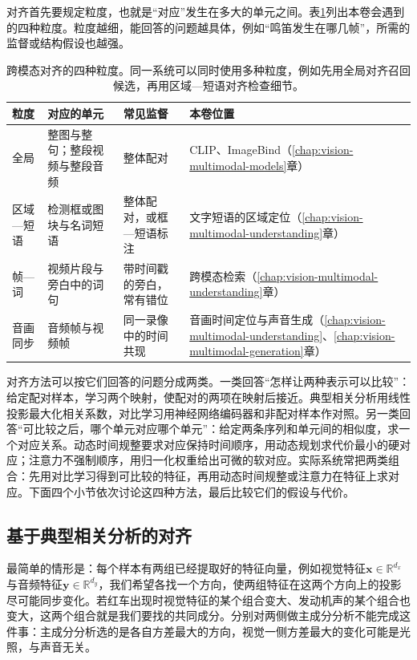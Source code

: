对齐首先要规定粒度，也就是“对应”发生在多大的单元之间。表\ref{tab:vision-alignment-granularity}列出本卷会遇到的四种粒度。粒度越细，能回答的问题越具体，例如“鸣笛发生在哪几帧”，所需的监督或结构假设也越强。

\begin{table}[htbp]
  \centering
  \small
  \begin{tabularx}{\linewidth}{@{}p{16mm}p{30mm}XX@{}}
    \toprule
    粒度 & 对应的单元 & 常见监督 & 本卷位置\\
    \midrule
    全局 & 整图与整句；整段视频与整段音频 & 整体配对 & CLIP、ImageBind（\ref{chap:vision-multimodal-models}章）\\
    区域—短语 & 检测框或图块与名词短语 & 整体配对，或框—短语标注 & 文字短语的区域定位（\ref{chap:vision-multimodal-understanding}章）\\
    帧—词 & 视频片段与旁白中的词句 & 带时间戳的旁白，常有错位 & 跨模态检索（\ref{chap:vision-multimodal-understanding}章）\\
    音画同步 & 音频帧与视频帧 & 同一录像中的时间共现 & 音画时间定位与声音生成（\ref{chap:vision-multimodal-understanding}、\ref{chap:vision-multimodal-generation}章）\\
    \bottomrule
  \end{tabularx}
  \caption{跨模态对齐的四种粒度。同一系统可以同时使用多种粒度，例如先用全局对齐召回候选，再用区域—短语对齐检查细节。}
  \label{tab:vision-alignment-granularity}
\end{table}

对齐方法可以按它们回答的问题分成两类。一类回答“怎样让两种表示可以比较”：给定配对样本，学习两个映射，使配对的两项在映射后接近。典型相关分析用线性投影最大化相关系数，对比学习用神经网络编码器和非配对样本作对照。另一类回答“可比较之后，哪个单元对应哪个单元”：给定两条序列和单元间的相似度，求一个对应关系。动态时间规整要求对应保持时间顺序，用动态规划求代价最小的硬对应；注意力不强制顺序，用归一化权重给出可微的软对应。实际系统常把两类组合：先用对比学习得到可比较的特征，再用动态时间规整或注意力在特征上求对应。下面四个小节依次讨论这四种方法，最后比较它们的假设与代价。

\subsection{基于典型相关分析的对齐}
\label{sec:vision-alignment-cca}

最简单的情形是：每个样本有两组已经提取好的特征向量，例如视觉特征$\bm x\in\mathbb R^{d_x}$与音频特征$\bm y\in\mathbb R^{d_y}$，我们希望各找一个方向，使两组特征在这两个方向上的投影尽可能同步变化。若红车出现时视觉特征的某个组合变大、发动机声的某个组合也变大，这两个组合就是我们要找的共同成分。分别对两侧做主成分分析不能完成这件事：主成分分析选的是各自方差最大的方向，视觉一侧方差最大的变化可能是光照，与声音无关。


